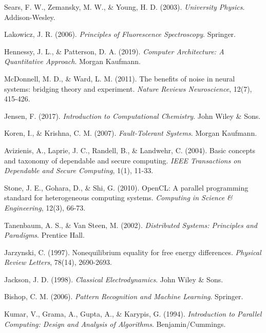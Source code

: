 \documentclass[12pt,a4paper]{article}
\begin{document}
\begin{thebibliography}{99}
Sears, F. W., Zemansky, M. W., \& Young, H. D. (2003). \textit{University Physics}. Addison-Wesley.

Lakowicz, J. R. (2006). \textit{Principles of Fluorescence Spectroscopy}. Springer.

Hennessy, J. L., \& Patterson, D. A. (2019). \textit{Computer Architecture: A Quantitative Approach}. Morgan Kaufmann.

McDonnell, M. D., \& Ward, L. M. (2011). The benefits of noise in neural systems: bridging theory and experiment. \textit{Nature Reviews Neuroscience}, 12(7), 415-426.

Jensen, F. (2017). \textit{Introduction to Computational Chemistry}. John Wiley \& Sons.

Koren, I., \& Krishna, C. M. (2007). \textit{Fault-Tolerant Systems}. Morgan Kaufmann.

Avizienis, A., Laprie, J. C., Randell, B., \& Landwehr, C. (2004). Basic concepts and taxonomy of dependable and secure computing. \textit{IEEE Transactions on Dependable and Secure Computing}, 1(1), 11-33.

Stone, J. E., Gohara, D., \& Shi, G. (2010). OpenCL: A parallel programming standard for heterogeneous computing systems. \textit{Computing in Science \& Engineering}, 12(3), 66-73.

Tanenbaum, A. S., \& Van Steen, M. (2002). \textit{Distributed Systems: Principles and Paradigms}. Prentice Hall.

Jarzynski, C. (1997). Nonequilibrium equality for free energy differences. \textit{Physical Review Letters}, 78(14), 2690-2693.

Jackson, J. D. (1998). \textit{Classical Electrodynamics}. John Wiley \& Sons.

Bishop, C. M. (2006). \textit{Pattern Recognition and Machine Learning}. Springer.

Kumar, V., Grama, A., Gupta, A., \& Karypis, G. (1994). \textit{Introduction to Parallel Computing: Design and Analysis of Algorithms}. Benjamin/Cummings.

\end{thebibliography}
\end{document}
